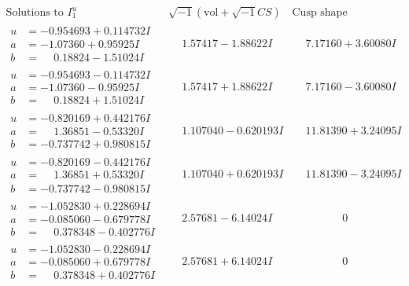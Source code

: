 \documentclass[1p]{elsarticle_modified}
\theoremstyle{definition}
\newcommand{\I}{\sqrt{-1}}
\begin{document}
$$\begin{array}{c|c|c}  
\text{Solutions to }I^u_{1}& \I (\text{vol} + \sqrt{-1}CS) & \text{Cusp shape}\\
 \hline 
\begin{aligned}
u &= -0.954693 + 0.114732 I \\
a &= -1.07360 + 0.95925 I \\
b &= \phantom{-}0.18824 - 1.51024 I\end{aligned}
 & \phantom{-}1.57417 - 1.88622 I & \phantom{-}7.17160 + 3.60080 I \\ \hline\begin{aligned}
u &= -0.954693 - 0.114732 I \\
a &= -1.07360 - 0.95925 I \\
b &= \phantom{-}0.18824 + 1.51024 I\end{aligned}
 & \phantom{-}1.57417 + 1.88622 I & \phantom{-}7.17160 - 3.60080 I \\ \hline\begin{aligned}
u &= -0.820169 + 0.442176 I \\
a &= \phantom{-}1.36851 - 0.53320 I \\
b &= -0.737742 + 0.980815 I\end{aligned}
 & \phantom{-}1.107040 - 0.620193 I & \phantom{-}11.81390 + 3.24095 I \\ \hline\begin{aligned}
u &= -0.820169 - 0.442176 I \\
a &= \phantom{-}1.36851 + 0.53320 I \\
b &= -0.737742 - 0.980815 I\end{aligned}
 & \phantom{-}1.107040 + 0.620193 I & \phantom{-}11.81390 - 3.24095 I \\ \hline\begin{aligned}
u &= -1.052830 + 0.228694 I \\
a &= -0.085060 - 0.679778 I \\
b &= \phantom{-}0.378348 - 0.402776 I\end{aligned}
 & \phantom{-}2.57681 - 6.14024 I & \phantom{-0.000000 } 0 \\ \hline\begin{aligned}
u &= -1.052830 - 0.228694 I \\
a &= -0.085060 + 0.679778 I \\
b &= \phantom{-}0.378348 + 0.402776 I\end{aligned}
 & \phantom{-}2.57681 + 6.14024 I & \phantom{-0.000000 } 0 \\ \hline\begin{aligned}

\end{aligned}
\end{array}$$
\end{document}
